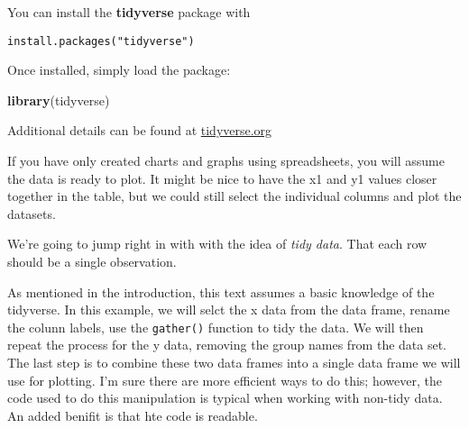 \documentclass[]{book}
\newenvironment{Shaded}{\begin{snugshade}}{\end{snugshade}}
\newcommand{\CommentTok}[1]{\textcolor[rgb]{0.56,0.35,0.01}{\textit{#1}}}
\newcommand{\DataTypeTok}[1]{\textcolor[rgb]{0.13,0.29,0.53}{#1}}
\newcommand{\KeywordTok}[1]{\textcolor[rgb]{0.13,0.29,0.53}{\textbf{#1}}}
\newcommand{\NormalTok}[1]{#1}
\newcommand{\OperatorTok}[1]{\textcolor[rgb]{0.81,0.36,0.00}{\textbf{#1}}}
\newcommand{\StringTok}[1]{\textcolor[rgb]{0.31,0.60,0.02}{#1}}
\theoremstyle{definition}
\theoremstyle{definition}
\theoremstyle{definition}
\theoremstyle{remark}
\begin{document}
You can install the \textbf{tidyverse} package with

\begin{verbatim}
install.packages("tidyverse")
\end{verbatim}

Once installed, simply load the package:

\begin{Shaded}
\begin{Highlighting}[]
\KeywordTok{library}\NormalTok{(tidyverse)}
\end{Highlighting}
\end{Shaded}

Additional details can be found at
\href{https://www.tidyverse.org}{tidyverse.org}

If you have only created charts and graphs using spreadsheets, you will
assume the data is ready to plot. It might be nice to have the x1 and y1
values closer together in the table, but we could still select the
individual columns and plot the datasets.

We're going to jump right in with with the idea of \emph{tidy data}.
That each row should be a single observation.

As mentioned in the introduction, this text assumes a basic knowledge of
the tidyverse. In this example, we will selct the x data from the data
frame, rename the colunn labels, use the \texttt{gather()} function to
tidy the data. We will then repeat the process for the y data, removing
the group names from the data set. The last step is to combine these two
data frames into a single data frame we will use for plotting. I'm sure
there are more efficient ways to do this; however, the code used to do
this manipulation is typical when working with non-tidy data. An added
benifit is that hte code is readable.

\begin{Shaded}
\end{Shaded}
\end{document}
